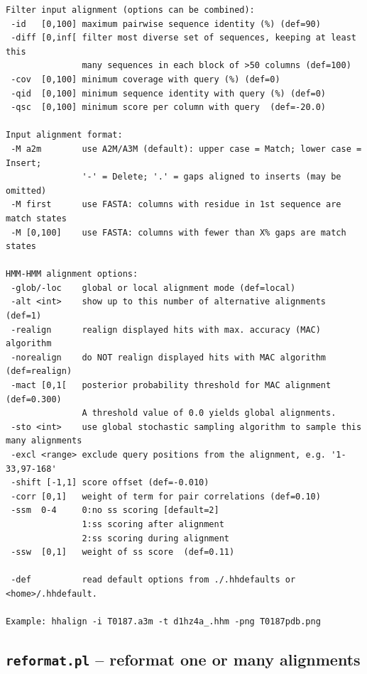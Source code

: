\documentclass[11pt,a4paper]{article}
\begin{document}
\begin{verbatim}
Filter input alignment (options can be combined):                         
 -id   [0,100] maximum pairwise sequence identity (%) (def=90)   
 -diff [0,inf[ filter most diverse set of sequences, keeping at least this    
               many sequences in each block of >50 columns (def=100)
 -cov  [0,100] minimum coverage with query (%) (def=0) 
 -qid  [0,100] minimum sequence identity with query (%) (def=0) 
 -qsc  [0,100] minimum score per column with query  (def=-20.0)

Input alignment format:                                                     
 -M a2m        use A2M/A3M (default): upper case = Match; lower case = Insert;
               '-' = Delete; '.' = gaps aligned to inserts (may be omitted)   
 -M first      use FASTA: columns with residue in 1st sequence are match states
 -M [0,100]    use FASTA: columns with fewer than X% gaps are match states   

HMM-HMM alignment options:                                                  
 -glob/-loc    global or local alignment mode (def=local)         
 -alt <int>    show up to this number of alternative alignments (def=1)    
 -realign      realign displayed hits with max. accuracy (MAC) algorithm 
 -norealign    do NOT realign displayed hits with MAC algorithm (def=realign)
 -mact [0,1[   posterior probability threshold for MAC alignment (def=0.300) 
               A threshold value of 0.0 yields global alignments.
 -sto <int>    use global stochastic sampling algorithm to sample this many alignments
 -excl <range> exclude query positions from the alignment, e.g. '1-33,97-168'
 -shift [-1,1] score offset (def=-0.010)                                      
 -corr [0,1]   weight of term for pair correlations (def=0.10)               
 -ssm  0-4     0:no ss scoring [default=2]               
               1:ss scoring after alignment                                  
               2:ss scoring during alignment                                 
 -ssw  [0,1]   weight of ss score  (def=0.11)                               

 -def          read default options from ./.hhdefaults or <home>/.hhdefault. 

Example: hhalign -i T0187.a3m -t d1hz4a_.hhm -png T0187pdb.png 
\end{verbatim} 
\normalsize


\subsection{{\tt reformat.pl} -- reformat one or many alignments}
\end{document}
